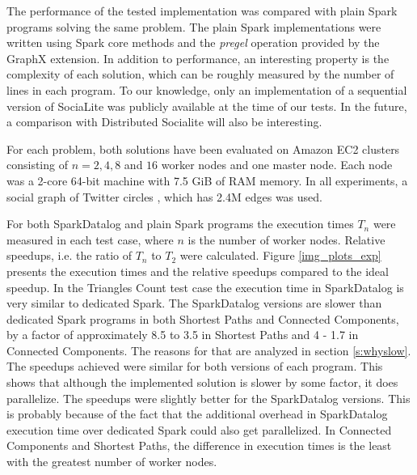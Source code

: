The performance of the tested implementation was compared with plain Spark programs solving the same problem. The plain Spark implementations were written using Spark core methods and the \emph{pregel} operation provided by the GraphX extension. In addition to performance, an interesting property is the complexity of each solution, which can be roughly measured by the number of lines in each program. To our knowledge, only an implementation of a sequential version of SociaLite was publicly available at the time of our tests. In the future, a comparison with Distributed Socialite will also be interesting.

For each problem, both solutions have been evaluated on Amazon EC2 clusters consisting of $n = 2, 4, 8$ and $16$ worker nodes and one master node. Each node was a 2-core 64-bit machine with 7.5 GiB of RAM memory.  In all experiments, a social graph of Twitter circles \cite{twitterdata}, which has 2.4M edges was used.

For both SparkDatalog and plain Spark programs the execution times $T_n$ were measured in each test case, where $n$ is the number of worker nodes. Relative speedups, i.e. the ratio of $T_n$ to $T_2$ were calculated. Figure \ref{img_plots_exp} presents the execution times and the relative speedups compared to the ideal speedup. In the Triangles Count test case the execution time in SparkDatalog is very similar to dedicated Spark. The SparkDatalog versions are slower than dedicated Spark programs in both Shortest Paths and Connected Components, by a factor of approximately 8.5 to 3.5 in Shortest Paths and 4 - 1.7 in Connected Components. The reasons for that are analyzed in section \ref{s:whyslow}. The speedups achieved were similar for both versions of each program. This shows that although the implemented solution is slower by some factor, it does parallelize. The speedups were slightly better for the SparkDatalog versions. This is probably because of the fact that the additional overhead in SparkDatalog execution time over dedicated Spark could also get parallelized. In Connected Components and Shortest Paths, the difference in execution times is the least with the greatest number of worker nodes.

